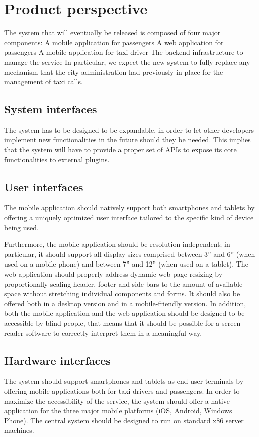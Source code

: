 \section{Product perspective}
The system that will eventually be released is composed of four major components:
A mobile application for passengers
A web application for passengers
A mobile application for taxi driver
The backend infrastructure to manage the service
In particular, we expect the new system to fully replace any mechanism that the city administration had previously in place for the management of taxi calls.

\subsection{System interfaces}
The system has to be designed to be expandable, in order to let other developers implement new functionalities in the future should they be needed. This implies that the system will have to provide a proper set of APIs to expose its core functionalities to external plugins. 

\subsection{User interfaces}
The mobile application should natively support both smartphones and tablets by offering a uniquely optimized user interface tailored to the specific kind of device being used. 

Furthermore, the mobile application should be resolution independent; in particular, it should support all display sizes comprised between 3” and 6” (when used on a mobile phone) and between 7” and 12” (when used on a tablet). 
The web application should properly address dynamic web page resizing by proportionally scaling header, footer and side bars to the amount of available space without stretching individual components and forms. It should also be offered both in a desktop version and in a mobile-friendly version. 
In addition, both the mobile application and the web application should be designed to be accessible by blind people, that means that it should be possible for a screen reader software to correctly interpret them in a meaningful way.

\subsection{Hardware interfaces}
The system should support smartphones and tablets as end-user terminals by offering mobile applications both for taxi drivers and passengers. 
In order to maximize the accessibility of the service, the system should offer a native application for the three major mobile platforms (iOS, Android, Windows Phone). 
The central system should be designed to run on standard x86 server machines.

